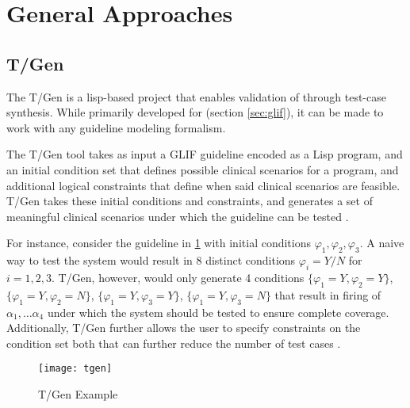 \section{General Approaches}\label{sec:general-approaches}

\subsection{T/Gen}

The T/Gen is a lisp-based project that enables validation
of \CIGs{} through test-case synthesis. While
primarily developed for \GLIF{} (section \ref{sec:glif}),
it can be made to work with any guideline modeling formalism.

The T/Gen tool takes as input a GLIF guideline encoded as a
Lisp program, and an initial condition set that defines
possible clinical scenarios for a program, and additional
logical constraints that define when said clinical scenarios are
feasible. T/Gen takes these initial conditions and constraints, and
generates a set of meaningful clinical scenarios under which the
guideline can be tested \cite{MillerJAMIA01}.

For instance, consider the guideline in \figurename{} \ref{fig:tgen-example}
with initial conditions $\varphi_1, \varphi_2, \varphi_3$. A naive
way to test the system would result in 8 distinct conditions $\varphi_i = Y/N$
for $i = 1,2,3$. T/Gen, however, would only generate
4 conditions $\{\varphi_1 = Y, \varphi_2 = Y\}$,
$\{\varphi_1 = Y, \varphi_2 = N\}$, $\{\varphi_1 = Y, \varphi_3 = Y\}$,
$\{\varphi_1 = Y, \varphi_3 = N\}$ that result in firing of $\alpha_1, \dots
\alpha_4$ under which the system should be tested to ensure complete coverage.
Additionally, T/Gen further allows the user to specify constraints on
the condition set both that can further reduce
the number of test cases \cite{MillerJAMIA01}.

\begin{figure}[b!]
  \centering
  \texttt{[image: tgen]}
  \caption{T/Gen Example}\label{fig:tgen-example}
\end{figure}

